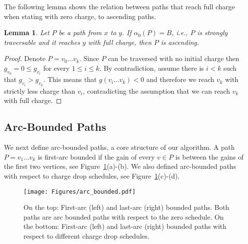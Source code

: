 \documentclass[11pt]{article}
\newtheorem{lemma}[theorem]{Lemma}
\begin{document}
The following lemma shows the relation between paths that reach full charge when stating with zero charge, to ascending paths.

\begin{lemma}\label{lemma:observation-monotone}
    Let $P$ be a path from $x$ to $y$. If $\alpha_0(P) = B$, i.e., $P$ is strongly traversable and it reaches $y$ with full charge, then $P$ is ascending.
\end{lemma}

\begin{proof}
    Denote $P = v_0 \ldots v_k$. Since $P$ can be traversed with no initial charge then $g_{v_0}=0 \le  g_{v_i}$  for every $1\le i \le k$. By contradiction, assume there is $i<k$ such that $g_{v_i} > g_{v_k}$. This means that $g(v_i \ldots v_k) < 0$ and therefore we reach $v_k$ with strictly less charge than $v_i$,   contradicting the assumption that we can reach $v_k$ with full charge.
\end{proof}

\subsection{Arc-Bounded Paths}

We next define arc-bounded paths, a core structure of our algorithm. A path $P=v_1\ldots v_k$ is first-arc bounded if the gain of every $v\in P$ is between the gains of the first two vertices, see Figure~\ref{fig:bounded_and_funnel_example}(a)-(b). We also defined arc-bounded paths with respect to charge drop schedules, see Figure~\ref{fig:bounded_and_funnel_example}(c)-(d). 

\begin{figure}[t]
    \centering
\texttt{[image: Figures/arc\_bounded.pdf]}
\caption{
On the top: First-arc (left) and last-arc (right) bounded paths. Both paths are arc bounded paths with respect to the zero schedule. 
On the bottom: First-arc (left) and last-arc (right) bounded paths with respect to different charge drop schedules.}
\label{fig:bounded_and_funnel_example}
\end{figure}
\end{document}
